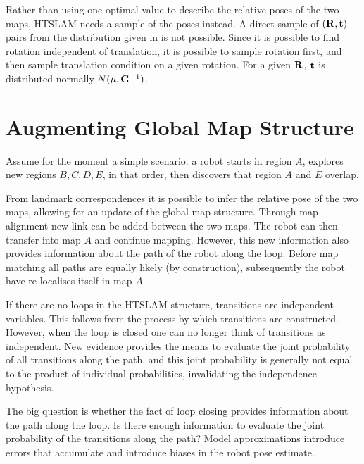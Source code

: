 Rather than using one optimal value to describe the relative poses of
the two maps, HTSLAM needs a sample of the poses instead. A direct
sample of $({\bf R,t})$ pairs from the distribution given in
 is not possible. Since it is possible to find
rotation independent of translation, it is possible to sample rotation
first, and then sample translation condition on a given rotation. For a
given ${\bf R}$, ${\bf t}$ is distributed normally $N(\mu, {\bf
G}^{-1})$.


\section{Augmenting Global Map Structure}
\label{sec:global_map_update}

Assume for the moment a simple scenario: a robot starts in
region $A$, explores new regions $B,C,D,E$, in that order, then
discovers that region $A$ and $E$ overlap.

From landmark correspondences it is possible to infer the relative
pose of the two maps, allowing for an update of the global map
structure. Through map alignment new link can be added between the two
maps. The robot can then transfer into map $A$ and continue mapping.
However, this new information also provides information about the path
of the robot along the loop. Before map matching all paths are equally
likely (by construction), subsequently the robot have re-localises
itself in map $A$.

If there are no loops in the HTSLAM structure, transitions are
independent variables. This follows from the process by which
transitions are constructed.  However, when the loop is closed one can
no longer think of transitions as independent. New evidence provides
the means to evaluate the joint probability of all transitions along
the path, and this joint probability is generally not equal to the
product of individual probabilities, invalidating the independence
hypothesis.

The big question is whether the fact of loop closing provides
information about the path along the loop. Is there enough information
to evaluate the joint probability of the transitions along the
path? Model approximations introduce errors that accumulate and
introduce biases in the robot pose estimate.

